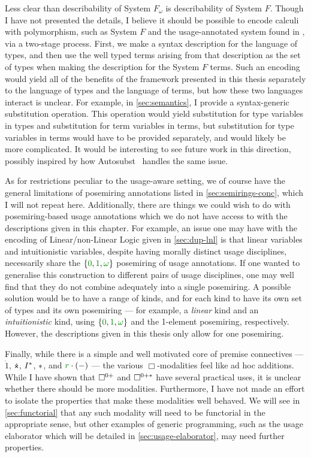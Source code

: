 Less clear than describability of System $F_\omega$ is describability of System
$F$.
Though I have not presented the details, I believe it should be possible to
encode calculi with polymorphism, such as System $F$ and the usage-annotated
system found in \citet{AbelBernardy2020}, via a two-stage process.
First, we make a syntax description for the language of types, and then use
the well typed terms arising from that description as the set of types when
making the description for the System $F$ terms.
Such an encoding would yield all of the benefits of the framework presented in
this thesis separately to the language of types and the language of terms, but
how these two languages interact is unclear.
For example, in \cref{sec:semantics}, I provide a syntax-generic substitution
operation.
This operation would yield substitution for type variables in types and
substitution for term variables in terms, but substitution for type variables in
terms would have to be provided separately, and would likely be more
complicated.
It would be interesting to see future work in this direction, possibly inspired
by how Autosubst~\citep{Autosubst15} handles the same issue.

As for restrictions peculiar to the usage-aware setting, we of course have the
general limitations of posemiring annotations listed in
\cref{sec:semirings-conc}, which I will not repeat here.
Additionally, there are things we could wish to do with posemiring-based usage
annotations which we do not have access to with the descriptions given in this
chapter.
For example, an issue one may have with the encoding of Linear/non-Linear Logic
given in \cref{sec:dup-lnl} is that linear variables and intuitionistic
variables, despite having morally distinct usage disciplines, necessarily share
the $\{\gr0, \gr1, \gr\omega\}$ posemiring of usage annotations.
If one wanted to generalise this construction to different pairs of usage
disciplines, one may well find that they do not combine adequately into a single
posemiring.
A possible solution would be to have a range of kinds, and for each kind to have
its own set of types and its own posemiring --- for example, a \emph{linear}
kind and an \emph{intuitionistic} kind, using $\{\gr0, \gr1, \gr\omega\}$ and
the 1-element posemiring, respectively.
However, the descriptions given in this thesis only allow for one posemiring.

Finally, while there is a simple and well motivated core of premise connectives
--- $\dot1$, $\dottimes$, $I^{\mathbin{*}}$, $\mathbin{*}$, and $\gr r \cdot \plr{-}$ --- the
various $\Box$-modalities feel like ad hoc additions.
While I have shown that $\Box^{0{+}}$ and $\Box^{0{+}{*}}$ have several practical uses, it
is unclear whether there should be more modalities.
Furthermore, I have not made an effort to isolate the properties that make these
modalities well behaved.
We will see in \cref{sec:functorial} that any such modality will need to be
functorial in the appropriate sense, but other examples of generic programming,
such as the usage elaborator which will be detailed in
\cref{sec:usage-elaborator}, may need further properties.
